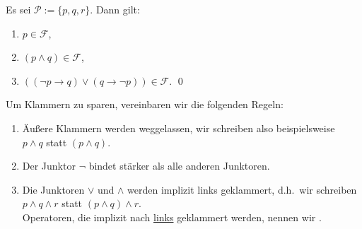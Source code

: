 \example 
Es sei $\mathcal{P} := \{ p, q, r \}$. Dann gilt:
\begin{enumerate}
\item $p \in \mathcal{F}$,
\item $(p \wedge q) \in \mathcal{F}$,
\item $((\neg p \rightarrow q) \vee (q \rightarrow \neg p)) \in \mathcal{F}$.  \qed
\end{enumerate}

\noindent
Um Klammern zu sparen, vereinbaren wir die folgenden Regeln:
\begin{enumerate}
\item Äußere Klammern werden weggelassen, wir schreiben also beispielsweise \\[0.2cm]
      \hspace*{1.3cm} $p \wedge q$ \quad statt \quad $(p \wedge q)$.
\item Der Junktor $\neg$ bindet stärker als alle anderen Junktoren.
\item Die Junktoren  $\vee$ und $\wedge$ werden implizit links geklammert, d.h.~wir
      schreiben 
      \\[0.2cm]
      \hspace*{1.3cm} $p \wedge q \wedge r$ \quad statt \quad $(p \wedge q) \wedge r$.
      \\[0.2cm]
      Operatoren, die implizit nach \underline{links} geklammert werden, nennen wir .


\end{enumerate}
